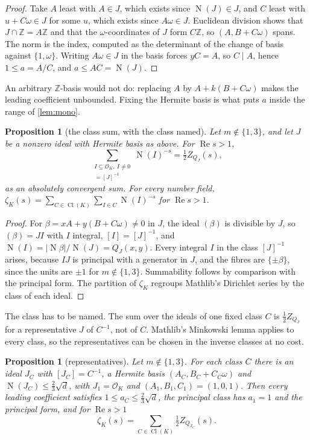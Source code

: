 \documentclass[11pt]{article}
\newtheorem{proposition}[theorem]{Proposition}
\theoremstyle{definition}
\newcommand{\re}{\operatorname{Re}}
\newcommand{\Z}{\mathbb{Z}}
\newcommand{\OK}{\mathcal{O}_K}
\newcommand{\Nm}{\operatorname{N}}
\newcommand{\Cl}{\operatorname{Cl}}
\begin{document}
{\begin{proof}
Take $A$ least with $A \in J$, which exists since $\Nm(J) \in J$, and $C$ least with $u + C\omega \in J$ for some $u$, which exists since $A\omega \in J$. Euclidean division shows that $J \cap \Z = A\Z$ and that the $\omega$-coordinates of $J$ form $C\Z$, so $(A, B + C\omega)$ spans. The norm is the index, computed as the determinant of the change of basis against $\{1, \omega\}$. Writing $A\omega \in J$ in the basis forces $yC = A$, so $C \mid A$, hence $1 \le a = A/C$, and $a \le AC = \Nm(J)$.
\end{proof}

An arbitrary $\Z$-basis would not do: replacing $A$ by $A + k(B + C\omega)$ makes the leading coefficient unbounded. Fixing the Hermite basis is what puts $a$ inside the range of \cref{lem:mono}.

\begin{proposition}[the class sum, with the class named]\label{prop:classsum}
Let $m \notin \{1, 3\}$, and let $J$ be a nonzero ideal with Hermite basis as above. For $\re s > 1$,
\[
\sum_{\substack{I \subseteq \OK,\ I \ne 0\\ [I] = [J]^{-1}}} \Nm(I)^{-s} = \tfrac12 Z_{Q_J}(s),
\]
as an absolutely convergent sum. For every number field, $\zeta_K(s) = \sum_{C \in \Cl(K)}\sum_{I \in C}\Nm(I)^{-s}$ for $\re s > 1$.
\end{proposition}

\begin{proof}
For $\beta = xA + y(B + C\omega) \ne 0$ in $J$, the ideal $(\beta)$ is divisible by $J$, so $(\beta) = JI$ with $I$ integral, $[I] = [J]^{-1}$, and $\Nm(I) = |\Nm\beta|/\Nm(J) = Q_J(x, y)$. Every integral $I$ in the class $[J]^{-1}$ arises, because $IJ$ is principal with a generator in $J$, and the fibres are $\{\pm\beta\}$, since the units are $\pm1$ for $m \notin \{1, 3\}$. Summability follows by comparison with the principal form. The partition of $\zeta_K$ regroups Mathlib's Dirichlet series by the class of each ideal.
\end{proof}

The class has to be named. The sum over the ideals of one fixed class $C$ is $\frac12 Z_{Q_J}$ for a representative $J$ of $C^{-1}$, not of $C$. Mathlib's Minkowski lemma applies to every class, so the representatives can be chosen in the inverse classes at no cost.

\begin{proposition}[representatives]\label{prop:reps}
Let $m \notin \{1, 3\}$. For each class $C$ there is an ideal $J_C$ with $[J_C] = C^{-1}$, a Hermite basis $(A_C, B_C + C_C\omega)$ and $\Nm(J_C) \le \frac23\sqrt d$, with $J_1 = \OK$ and $(A_1, B_1, C_1) = (1, 0, 1)$. Then every leading coefficient satisfies $1 \le a_C \le \frac23\sqrt d$, the principal class has $a_1 = 1$ and the principal form, and for $\re s > 1$
\[
\zeta_K(s) = \sum_{C \in \Cl(K)} \tfrac12 Z_{Q_{J_C}}(s).
\]
\end{proposition}

}
\end{document}
